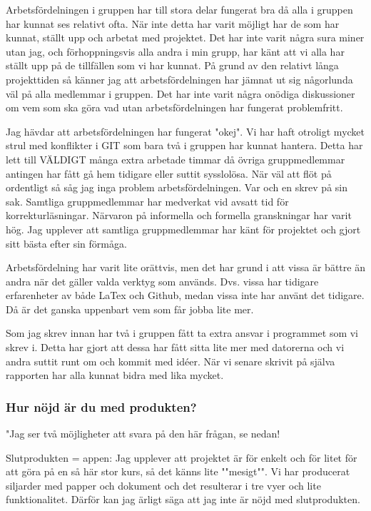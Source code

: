 \documentclass[a4paper]{article}
\begin{document}
Arbetsfördelningen i gruppen har till stora delar fungerat bra då alla i gruppen har kunnat ses relativt ofta. När inte detta har varit möjligt har de som har kunnat, ställt upp och arbetat med projektet. Det har inte varit några sura miner utan jag, och förhoppningsvis alla andra i min grupp, har känt att vi alla har ställt upp på de tillfällen som vi har kunnat. På grund av den relativt långa projekttiden så känner jag att arbetsfördelningen har jämnat ut sig någorlunda väl på alla medlemmar i gruppen. Det har inte varit några onödiga diskussioner om vem som ska göra vad utan arbetsfördelningen har fungerat problemfritt.

Jag hävdar att arbetsfördelningen har fungerat "okej". Vi har haft otroligt mycket strul med konflikter i GIT som bara två i gruppen har kunnat hantera. Detta har lett till VÄLDIGT många extra arbetade timmar då övriga gruppmedlemmar antingen har fått  gå hem tidigare eller suttit sysslolösa. När väl att flöt på ordentligt så såg jag inga problem arbetsfördelningen. Var och en skrev på sin sak. Samtliga gruppmedlemmar har medverkat vid avsatt tid för korrekturläsningar. Närvaron på informella och formella granskningar har varit hög. Jag upplever att samtliga gruppmedlemmar har känt för projektet och gjort sitt bästa efter sin förmåga.

Arbetsfördelning har varit lite orättvis, men det har grund i att vissa är bättre än andra när det gäller valda verktyg som används. Dvs. vissa har tidigare erfarenheter av både LaTex och Github, medan vissa inte har använt det tidigare. Då är det ganska uppenbart vem som får jobba lite mer. 

Som jag skrev innan har två i gruppen fått ta extra ansvar i programmet som vi skrev i. Detta har gjort att dessa har fått sitta lite mer med datorerna och vi andra suttit runt om och kommit med idéer. När vi senare skrivit på själva rapporten har alla kunnat bidra med lika mycket. 

\subsubsection{Hur nöjd är du med produkten?}
"Jag ser två möjligheter att svara på den här frågan, se nedan!

Slutprodukten = appen: Jag upplever att projektet är för enkelt och för litet för att göra på en så här stor kurs, så det känns lite ""mesigt"". Vi har producerat siljarder med papper och dokument och det resulterar i tre vyer och lite funktionalitet.
Därför kan jag ärligt säga att jag inte är nöjd med slutprodukten.
\end{document}
